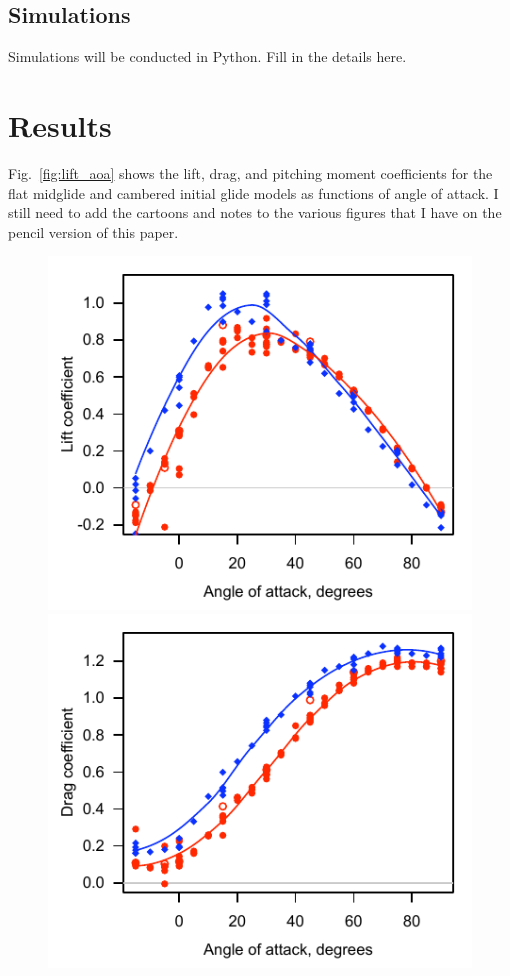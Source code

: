 \documentclass[10pt]{article}
\begin{document}
\subsection{Simulations}
Simulations will be conducted in Python.  Fill in the details here. 

\section{Results}
Fig.~\ref{fig:lift_aoa} shows the lift, drag, and pitching moment coefficients for the flat midglide and cambered initial glide models as functions of angle of attack.  I still need to add the cartoons and notes to the various figures that I have on the pencil version of this paper. 

\begin{figure}
\includegraphics{figures/lift_v_aoa.pdf} 
\includegraphics{figures/drag_v_aoa.pdf} 

\end{figure}
\end{document}
